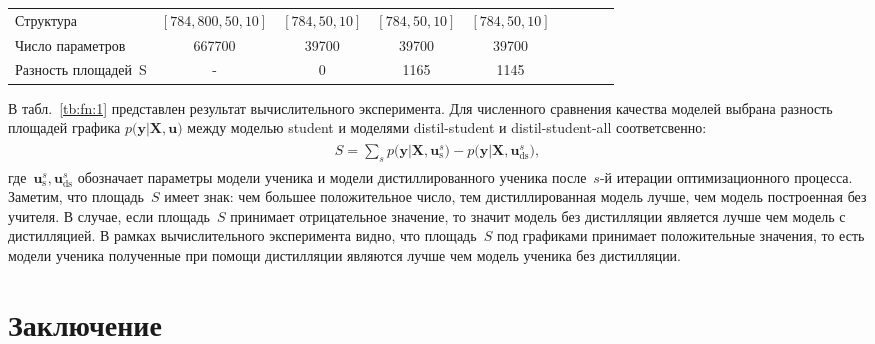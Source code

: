 \documentclass[12pt]{a&t}
\begin{document}
\begin{table}[]
\begin{center}
\begin{tabular}{|l|c|c|c|c|llll}
Структура           & $[784,800,50,10]$& $[784,50,10]$   & $[784,50,10]$  & $[784,50,10]$      &                      &                      &                      &                      \\ \cline{1-5}
Число параметров    &           667700                  &          39700                &         39700                &                 39700            &                      &                      &                      &                      \\ \cline{1-5}
Разность площадей~S   & -                           & 0                       &  1165               & 1145                    &                      &                      &                      &                      \\ \cline{1-5}
\end{tabular}
\end{center}
\end{table}

В табл.~\ref{tb:fn:1} представлен результат вычислительного эксперимента. Для численного сравнения качества моделей выбрана разность площадей графика $p\bigr(\mathbf{y}|\mathbf{X}, \mathbf{u}\bigr)$ между моделью student и моделями distil-student  и 
distil-student-all соответсвенно:
\begin{gather}
\label{eq:ex:8}
\begin{aligned}
S = \sum_{s} p\bigr(\mathbf{y}|\mathbf{X}, \mathbf{u}^s_{\text{s}}\bigr) - p\bigr(\mathbf{y}|\mathbf{X}, \mathbf{u}^s_{\text{ds}}\bigr),
\end{aligned}
\end{gather}
где~$\mathbf{u}^s_{\text{s}}, \mathbf{u}^s_{\text{ds}}$ обозначает параметры модели ученика и модели дистиллированного ученика после~$s$-й итерации оптимизационного процесса. Заметим, что площадь~$S$ имеет знак: чем большее положительное число, тем дистиллированная модель лучше, чем модель построенная без учителя. В случае, если площадь~$S$ принимает отрицательное значение, то значит модель без дистилляции является лучше чем модель с дистилляцией. В рамках вычислительного эксперимента видно, что площадь~$S$ под графиками принимает положительные значения, то есть модели ученика полученные при помощи дистилляции являются лучше чем модель ученика без дистилляции.

\section{Заключение}
\end{document}
